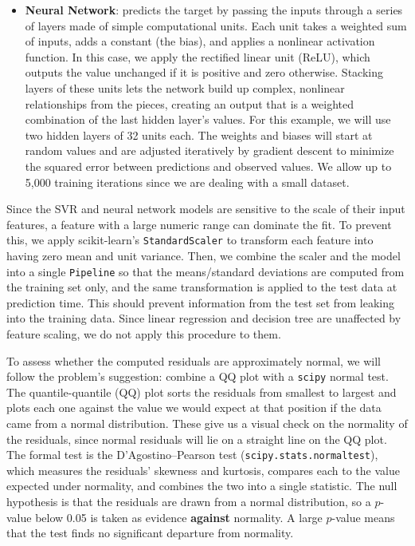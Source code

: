 \documentclass[11pt]{article}
\begin{document}
\begin{itemize}
    \item \textbf{Neural Network}: predicts the target by passing the inputs through a series of layers made of simple computational units. Each unit takes a weighted sum of inputs, adds a constant (the bias), and applies a nonlinear activation function. In this case, we apply the rectified linear unit (ReLU), which outputs the value unchanged if it is positive and zero otherwise. Stacking layers of these units lets the network build up complex, nonlinear relationships from the pieces, creating an output that is a weighted combination of the last hidden layer's values. For this example, we will use two hidden layers of 32 units each. The weights and biases will start at random values and are adjusted iteratively by gradient descent to minimize the squared error between predictions and observed values. We allow up to 5{,}000 training iterations since we are dealing with a small dataset.
\end{itemize}
 
Since the SVR and neural network models are sensitive to the scale of their input features, a feature with a large numeric range can dominate the fit. To prevent this, we apply scikit-learn's \texttt{StandardScaler} to transform each feature into having zero mean and unit variance. Then, we combine the scaler and the model into a single \texttt{Pipeline} so that the means/standard deviations are computed from the training set only, and the same transformation is applied to the test data at prediction time. This should prevent information from the test set from leaking into the training data. Since linear regression and decision tree are unaffected by feature scaling, we do not apply this procedure to them.
 
To assess whether the computed residuals are approximately normal, we will follow the problem's suggestion: combine a QQ plot with a \texttt{scipy} normal test. The quantile-quantile (QQ) plot sorts the residuals from smallest to largest and plots each one against the value we would expect at that position if the data came from a normal distribution. These give us a visual check on the normality of the residuals, since normal residuals will lie on a straight line on the QQ plot. The formal test is the D'Agostino--Pearson test (\texttt{scipy.stats.normaltest}), which measures the residuals' skewness and kurtosis, compares each to the value expected under normality, and combines the two into a single statistic. The null hypothesis is that the residuals are drawn from a normal distribution, so a $p$-value below 0.05 is taken as evidence \textbf{against} normality. A large $p$-value means that the test finds no significant departure from normality.
\end{document}

